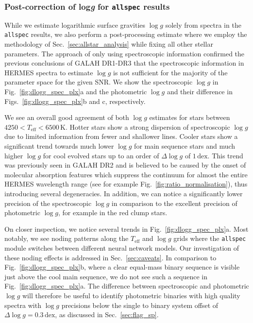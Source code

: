 \documentclass[
  journal=pasa,
  manuscript=research-paper, %
  year=2024,
  volume=37
]{cup-journal}
\newcommand{\Teff}{$T_\mathrm{eff}$\xspace}
\newcommand{\logg}{$\log g$\xspace}
\begin{document}
\subsubsection{Post-correction of {log\textit{g}} for \texttt{allspec} results}

While we estimate logarithmic surface gravities \logg solely from spectra in the \texttt{allspec} results, we also perform a post-processing estimate where we employ the methodology of Sec.~\ref{sec:allstar_analysis} while fixing all other stellar parameters. The approach of only using spectroscopic information confirmed the previous conclusions of GALAH DR1-DR3 that the spectroscopic information in HERMES spectra to estimate \logg is not sufficient for the majority of the parameter space for the given SNR. We show the spectroscopic \logg in Fig.~\ref{fig:dlogg_spec_plx}a and the photometric \logg and their difference in Figs.~\ref{fig:dlogg_spec_plx}b and c, respectively.

We see an overall good agreement of both \logg estimates for stars between $4250 < T_\text{eff} < 6500\,\mathrm{K}$. Hotter stars show a strong dispersion of spectroscopic \logg due to limited information from fewer and shallower lines. Cooler stars show a significant trend towards much lower \logg for main sequence stars and much higher \logg for cool evolved stars up to an order of $\Delta \log g$ of $1\,\mathrm{dex}$. This trend was previously seen in GALAH DR2 \citep{Buder2018} and is believed to be caused by the onset of molecular absorption features which suppress the continuum for almost the entire HERMES wavelength range (see for example Fig.~\ref{fig:ratio_normalisation}), thus introducing several degeneracies. In addition, we can notice a significantly lower precision of the spectroscopic \logg in comparison to the excellent precision of photometric \logg, for example in the red clump stars.

On closer inspection, we notice several trends in Fig.~\ref{fig:dlogg_spec_plx}a. Most notably, we see noding patterns along the \Teff and \logg grids where the \texttt{allspec} module switches between different neural network models. Our investigation of these noding effects is addressed in Sec.~\ref{sec:caveats}. In comparison to Fig.~\ref{fig:dlogg_spec_plx}b, where a clear equal-mass binary sequence is visible just above the cool main sequence, we do not see such a sequence in Fig.~\ref{fig:dlogg_spec_plx}a. The difference between spectroscopic and photometric \logg will therefore be useful to identify photometric binaries with high quality spectra with \logg precisions below the single to binary system offset of $\Delta \log g = 0.3\,\mathrm{dex}$, as discussed in Sec.~\ref{sec:flag_sp}.
\end{document}
